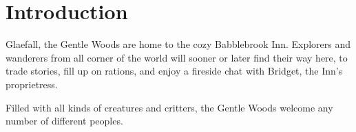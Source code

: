 \chapter{Introduction}

\begin{multicols*}{1}
     Glaefall, the Gentle Woods are home to the cozy Babblebrook Inn.
    Explorers and wanderers from all corner of the world will sooner or later find their way here, to trade stories, fill up on rations, and enjoy a fireside chat with Bridget, the Inn's proprietress.
    
    Filled with all kinds of creatures and critters, the Gentle Woods welcome any number of different peoples.
\end{multicols*}

